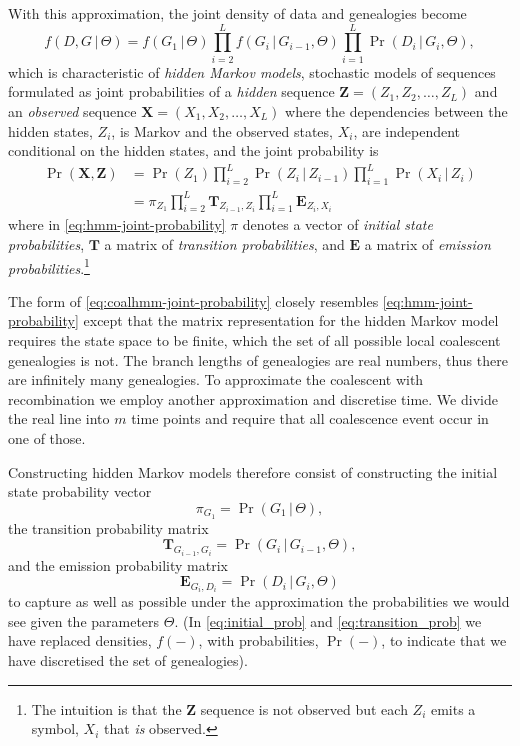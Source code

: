 \documentclass[graybox]{svmult}
\newcommand{\G}{\ensuremath{G}}
\renewcommand{\D}{\ensuremath{D}}
\newcommand{\T}{\ensuremath{\mathbf{T}}}
\renewcommand{\E}{\ensuremath{\mathbf{E}}}
\begin{document}
With this approximation, the joint density of data and genealogies become
\begin{equation}
  \label{eq:coalhmm-joint-probability}
  f(\D,\G\,|\,\Theta) = 
  	f(\G_1\,|\,\Theta)
  	\prod_{i=2}^{L}f(\G_{i}\,|\,\G_{i-1},\Theta)
  	\prod_{i=1}^L \Pr(\D_i\,|\,\G_i,\Theta)
  	,
\end{equation}
which is characteristic of \emph{hidden Markov models}, stochastic models of sequences formulated as joint probabilities of a \emph{hidden} sequence $\mathbf{Z}=(Z_1,Z_2,\ldots,Z_L)$ and an \emph{observed} sequence $\mathbf{X}=(X_1,X_2,\ldots,X_L)$ where the dependencies between the hidden states, $Z_i$, is Markov and the observed states, $X_i$, are independent conditional on the hidden states, and the joint probability is
\begin{align}
  \Pr(\mathbf{X},\mathbf{Z})
    &= 
  	\Pr(Z_1)
  	\prod_{i=2}^{L}\Pr(Z_{i}\,|\,Z_{i-1})
  	\prod_{i=1}^L \Pr(X_i\,|\,Z_i)
  	\\
    \label{eq:hmm-joint-probability}
  	&=
  	\pi_{Z_1}
  	\prod_{i=2}^{L}\T_{Z_{i-1},Z_{i}}
  	\prod_{i=1}^L  \E_{Z_i,X_i}
\end{align}
where in \eqref{eq:hmm-joint-probability} $\pi$ denotes a vector of \emph{initial state probabilities}, $\T$ a matrix of \emph{transition probabilities}, and $\E$ a matrix of \emph{emission probabilities}.\footnote{The intuition is that the $\mathbf{Z}$ sequence is not observed but each $Z_i$ emits a symbol, $X_i$ that \emph{is} observed.}

The form of \eqref{eq:coalhmm-joint-probability} closely resembles \eqref{eq:hmm-joint-probability} except that the matrix representation for the hidden Markov model requires the state space to be finite, which the set of all possible local coalescent genealogies is not. The branch lengths of genealogies are real numbers, thus there are infinitely many genealogies. To approximate the coalescent with recombination we employ another approximation and discretise time. We divide the real line into $m$ time points and require that all coalescence event occur in one of those.

Constructing hidden Markov models therefore consist of constructing the initial state probability vector
\begin{equation}
  \label{eq:initial_prob}
  \pi_{\G_1} = \Pr(\G_1\,|\,\Theta),
\end{equation}
the transition probability matrix
\begin{equation}
  \label{eq:transition_prob}
  \T_{\G_{i-1},\G_i} = \Pr(\G_i\,|\,\G_{i-1},\Theta),
\end{equation}
and the emission probability matrix
\begin{equation}
  \E_{\G_i,\D_i} = \Pr(\D_i\,|\,\G_i,\Theta)
\end{equation}
to capture as well as possible under the approximation the probabilities we would see given the parameters $\Theta$. (In \eqref{eq:initial_prob} and \eqref{eq:transition_prob} we have replaced densities, $f(-)$, with probabilities, $\Pr(-)$, to indicate that we have discretised the set of genealogies).
\end{document}
